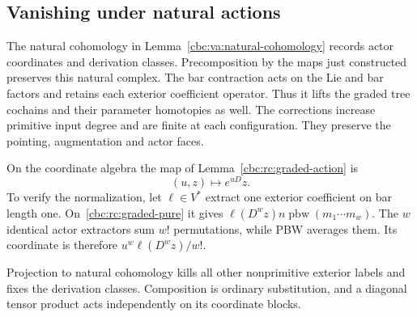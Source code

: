 \subsection{Vanishing under natural actions}

The natural cohomology in
Lemma~\ref{cbc:va:natural-cohomology} records actor
coordinates and derivation classes. Precomposition
by the maps just constructed preserves this natural
complex. The bar contraction acts on the Lie and
bar factors and retains each exterior coefficient
operator. Thus it lifts the graded tree cochains
and their parameter homotopies as well. The
corrections increase primitive input degree and
are finite at each configuration. They preserve
the pointing, augmentation and actor faces.

On the coordinate algebra the map of
Lemma~\ref{cbc:rc:graded-action} is
\begin{equation}\label{cbc:rc:graded-coordinate}
 (u,z)\longmapsto e^{uD}z.
\end{equation}
To verify the normalization, let $\ell\in V^*$
extract one exterior coefficient on bar length one.
On~\eqref{cbc:rc:graded-pure} it gives
$\ell(D^wz)n\operatorname{pbw}(m_1\cdots m_w)$.
The $w$ identical actor extractors sum $w!$
permutations, while PBW averages them.
Its coordinate is therefore
$u^w\ell(D^wz)/w!$.

Projection to natural cohomology kills all other
nonprimitive exterior labels and fixes the
derivation classes. Composition is ordinary
substitution, and a diagonal tensor product
acts independently on its coordinate blocks.

